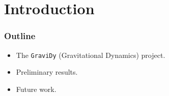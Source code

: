 \section{Introduction}

\begin{frame}
    \frametitle{Outline}
    \begin{itemize}
        \item The \texttt{GraviDy} (Gravitational Dynamics) project.
        \item Preliminary results.
        \item Future work.
    \end{itemize}
\end{frame}

%
%
